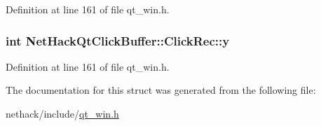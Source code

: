 Definition at line 161 of file qt\+\_\+win.\+h.

\hypertarget{structNetHackQtClickBuffer_1_1ClickRec_a6642d62ffcdeef81209dc24ccea3ea54}{
\subsubsection[{y}]{\setlength{\rightskip}{0pt plus 5cm}int Net\+Hack\+Qt\+Click\+Buffer\+::\+Click\+Rec\+::y}}\label{structNetHackQtClickBuffer_1_1ClickRec_a6642d62ffcdeef81209dc24ccea3ea54}


Definition at line 161 of file qt\+\_\+win.\+h.



The documentation for this struct was generated from the following file\+:\begin{DoxyCompactItemize}
\item 
nethack/include/\hyperlink{qt__win_8h}{qt\+\_\+win.\+h}\end{DoxyCompactItemize}
